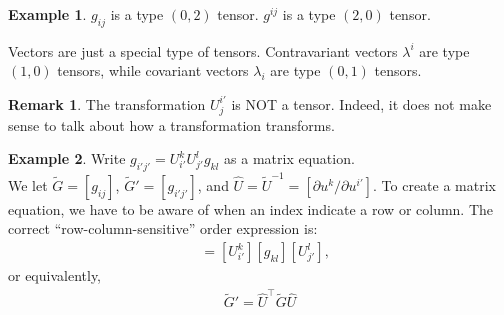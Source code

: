 \documentclass{article}
\theoremstyle{definition}
\newtheorem{rmk}{Remark}[section]
\newtheorem{exmp}{Example}[section]
\begin{document}
\begin{exmp}
	$g_{ij}$ is a type $(0,2)$ tensor. $g^{ij}$ is a type $(2,0)$ tensor. 
\end{exmp}
Vectors are just a special type of tensors. Contravariant vectors $\lambda^i$ are type $(1,0)$ tensors, while covariant vectors $\lambda_i$ are type $(0,1)$ tensors. 
\begin{rmk}
	The transformation $U^{i'}_j$ is NOT a tensor. Indeed, it does not make sense to talk about how a transformation transforms. 
\end{rmk}
\begin{exmp}
	Write $g_{i'j'} = U^k_{i'}U^l_{j'}g_{kl}$ as a matrix equation.\\
	
	We let $\tilde{G} = [g_{ij}]$, $\tilde{G}'= [g_{i'j'}]$, and $\hat{U} = \tilde{U}^{-1} = [\partial u^k/\partial u^{i'}]$. To create a matrix equation, we have to be aware of when an index indicate a row or column. The correct ``row-column-sensitive'' order expression is:
	\begin{align*}
	[g_{i'j'}] &= [U^{k}_{i'}][g_{kl}][U^l_{j'}],
	\end{align*}
	or equivalently,
	\begin{align*}
	\boxed{\tilde{G}' = \hat{U}^{\top}\tilde{G}\hat{U}}
	\end{align*}
\end{exmp}
\end{document}
